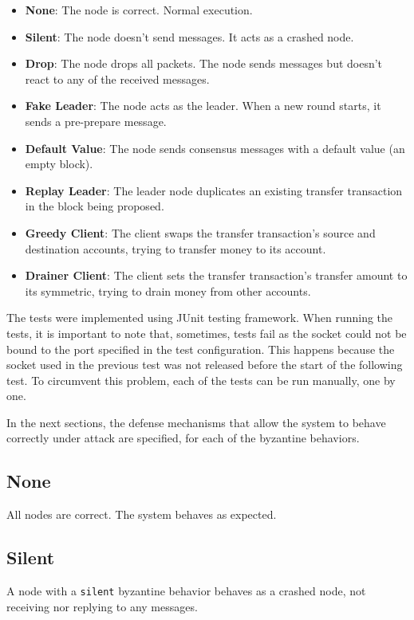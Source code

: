 \documentclass[letterpaper,twocolumn,10pt]{article}
\begin{document}
\begin{itemize}
    \item \textbf{None}: The node is correct. Normal execution.
    \item \textbf{Silent}: The node doesn't send messages. It acts as a crashed node.
    \item \textbf{Drop}: The node drops all packets. The node sends messages but doesn't react to any of the received messages.
    \item \textbf{Fake Leader}: The node acts as the leader. When a new round starts, it sends a pre-prepare message.
    \item \textbf{Default Value}: The node sends consensus messages with a default value (an empty block).
    \item \textbf{Replay Leader}: The leader node duplicates an existing transfer transaction in the block being proposed.
    \item \textbf{Greedy Client}: The client swaps the transfer transaction's source and destination accounts, trying to transfer money to its account.
    \item \textbf{Drainer Client}: The client sets the transfer transaction's transfer amount to its symmetric, trying to drain money from other accounts.
\end{itemize}

The tests were implemented using JUnit testing framework. When running the tests, it is important to note that, sometimes, tests fail as the socket could not be bound to the port specified in the test configuration. This happens because the socket used in the previous test was not released before the start of the following test. To circumvent this problem, each of the tests can be run manually, one by one.

In the next sections, the defense mechanisms that allow the system to behave correctly under attack are specified, for each of the byzantine behaviors.

\subsection{None}

All nodes are correct. The system behaves as expected.

\subsection{Silent}
\label{silent}

A node with a \texttt{silent} byzantine behavior behaves as a crashed node, not receiving nor replying to any messages.
\end{document}

